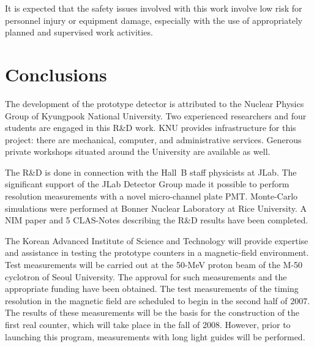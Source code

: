 It is expected that the safety issues involved with this work involve
low risk for personnel injury or equipment damage, especially with the
use of appropriately planned and supervised work activities.

\section{Conclusions}

The development of the prototype detector is attributed to the Nuclear 
Physics Group of Kyungpook National University.  Two experienced researchers 
and four students are engaged in this R\&D work. KNU provides infrastructure
for this project: there are mechanical, computer, and administrative 
services.  Generous private workshops situated around the University
are available as well.

The R\&D is done in connection with the Hall~B staff physicists at JLab. 
The significant support of the JLab Detector Group made it possible to 
perform resolution measurements with a novel micro-channel plate PMT. 
Monte-Carlo simulations were performed at Bonner Nuclear Laboratory at Rice 
University.  A NIM paper and 5 CLAS-Notes describing the R\&D results
have been completed.

The Korean Advanced Institute of Science and Technology will provide  
expertise and assistance in testing the prototype counters in a 
magnetic-field environment.  Test measurements will be carried out at the 
50-MeV proton beam of the M-50 cyclotron of Seoul University.  The approval 
for such measurements and the appropriate funding have been obtained.  The 
test measurements of the timing resolution in the magnetic field are 
scheduled to begin in the second half of 2007.  The results of these 
measurements will be the basis for the construction of the first real 
counter, which will take place in the fall of 2008.  However, prior to 
launching this program, measurements with long light guides will be 
performed.
